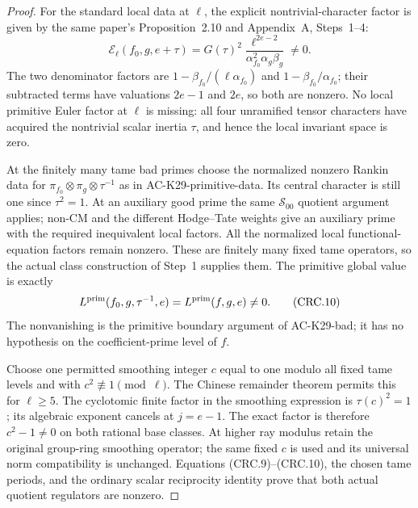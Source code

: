 \begin{proof}
For the standard local data at $\ell$, the explicit
nontrivial-character factor is given by the same
paper's Proposition~2.10 and Appendix~A, Steps~1--4:
\[
 \mathcal E_\ell(f_0,g,e+\tau)
    =G(\tau)^2\frac{\ell^{2e-2}}
                    {\alpha_{f_0}^{2}\alpha_g\beta_g}
       \ne0.                                             \tag{CRC.9}
\]
The two denominator factors are
$1-\beta_{f_0}/(\ell\alpha_{f_0})$ and
$1-\beta_{f_0}/\alpha_{f_0}$; their subtracted terms
have valuations $2e-1$ and $2e$, so both are nonzero.
No local primitive Euler factor at $\ell$ is missing:
all four unramified tensor characters have acquired
the nontrivial scalar inertia $\tau$, and hence the
local invariant space is zero.

At the finitely many tame bad primes choose the
normalized nonzero Rankin data for
$\pi_{f_0}\otimes\pi_g\otimes\tau^{-1}$ as in
AC-K29-primitive-data.  Its central character is still
one since $\tau^2=1$.  At an auxiliary good prime
the same $\mathcal S_{00}$ quotient argument applies;
non-CM and the different Hodge--Tate weights give
an auxiliary prime with the required inequivalent
local factors.  All the normalized local
functional-equation factors remain nonzero.
These are finitely many fixed tame operators, so the
actual class construction of Step~1 supplies them.
The primitive global value is exactly
\[
 L^{\rm prim}(f_0,g,\tau^{-1},e)
           =L^{\rm prim}(f,g,e)\ne0.                     \tag{CRC.10}
\]
The nonvanishing is the primitive boundary argument
of AC-K29-bad; it has no hypothesis on the
coefficient-prime level of $f$.

Choose one permitted smoothing integer $c$ equal to
one modulo all fixed tame levels and with
$c^2\not\equiv1\pmod\ell$.
The Chinese remainder theorem permits this for
$\ell\ge5$.  The cyclotomic finite factor in the
smoothing expression is $\tau(c)^2=1$; its algebraic
exponent cancels at $j=e-1$.  The exact factor is
therefore $c^2-1\ne0$ on both rational base classes.
At higher ray modulus retain the original group-ring
smoothing operator; the same fixed $c$ is used and
its universal norm compatibility is unchanged.
Equations (CRC.9)--(CRC.10), the chosen tame periods,
and the ordinary scalar reciprocity identity prove
that both actual quotient regulators are nonzero.


\end{proof}
